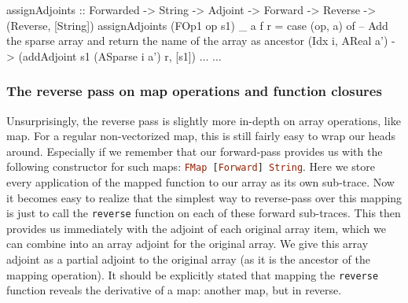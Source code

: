         \begin{haskell}[caption={Defining \texttt{assignAdjoints} for the indexing operation}, label=lst:assign_idx, gobble=12]
            assignAdjoints :: Forwarded -> String -> Adjoint -> Forward -> Reverse
                -> (Reverse, [String])
            assignAdjoints (FOp1 op s1) _ a f r = case (op, a) of
                -- Add the sparse array and return the name of the array as ancestor
                (Idx i, AReal a') -> (addAdjoint s1 (ASparse i a') r, [s1])
                $\dots$
            $\dots$
        \end{haskell}


        \subsubsection{The reverse pass on map operations and function closures}
            Unsurprisingly, the reverse pass is slightly more in-depth on array operations, like map.
            For a regular non-vectorized map, this is still fairly easy to wrap our heads around.
            Especially if we remember that our forward-pass provides us with the following constructor for such maps:
            \lstinline[language=haskell]{FMap [Forward] String}.
            Here we store every application of the mapped function to our array as its own sub-trace.
            Now it becomes easy to realize that the simplest way to reverse-pass over this mapping is just to call the \texttt{reverse} function on each of these forward sub-traces.
            This then provides us immediately with the adjoint of each original array item, which we can combine into an array adjoint for the original array.
            We give this array adjoint as a partial adjoint to the original array (as it is the ancestor of the mapping operation).
            It should be explicitly stated that mapping the \texttt{reverse} function reveals the derivative of a map: another map, but in reverse.

